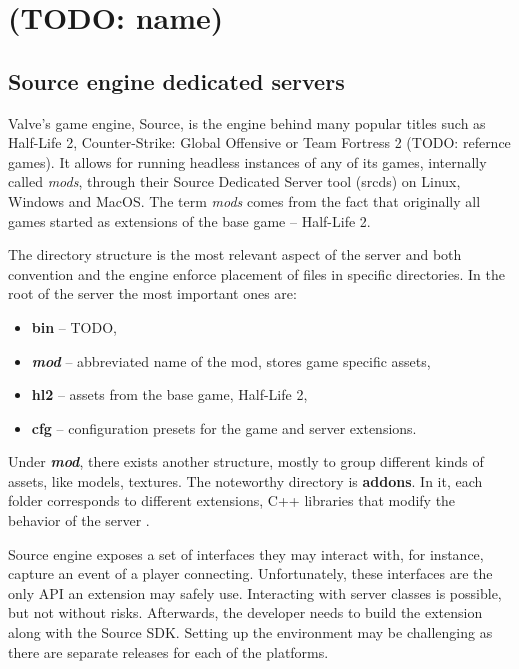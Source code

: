 \chapter{(TODO: name)}
\section{Source engine dedicated servers}

Valve's game engine, Source, is the engine behind many popular titles such as Half-Life 2, Counter-Strike: Global Offensive or Team Fortress 2 (TODO: refernce games).
It allows for running headless instances of any of its games, internally called \textit{mods}, through their Source Dedicated Server tool (srcds) on Linux, Windows and MacOS.
The term \textit{mods} comes from the fact that originally all games started as extensions of the base game -- Half-Life 2.

The directory structure is the most relevant aspect of the server and both convention and the engine enforce placement of files in specific directories.
In the root of the server the most important ones are:
\begin{itemize}
    \item \textbf{bin} -- TODO,
    \item \textbf{\textit{mod}} -- abbreviated name of the mod, stores game specific assets,
    \item \textbf{hl2} -- assets from the base game, Half-Life 2,
    \item \textbf{cfg} -- configuration presets for the game and server extensions.
\end{itemize}
Under \textbf{\textit{mod}}, there exists another structure, mostly to group different kinds of assets, like models, textures.
The noteworthy directory is \textbf{addons}.
In it, each folder corresponds to different extensions, C++ libraries that modify the behavior of the server \cite{server-plugins}.

Source engine exposes a set of interfaces they may interact with, for instance, capture an event of a player connecting.
Unfortunately, these interfaces are the only API an extension may safely use.
Interacting with server classes is possible, but not without risks.
Afterwards, the developer needs to build the extension along with the Source SDK.
Setting up the environment may be challenging as there are separate releases for each of the platforms.


